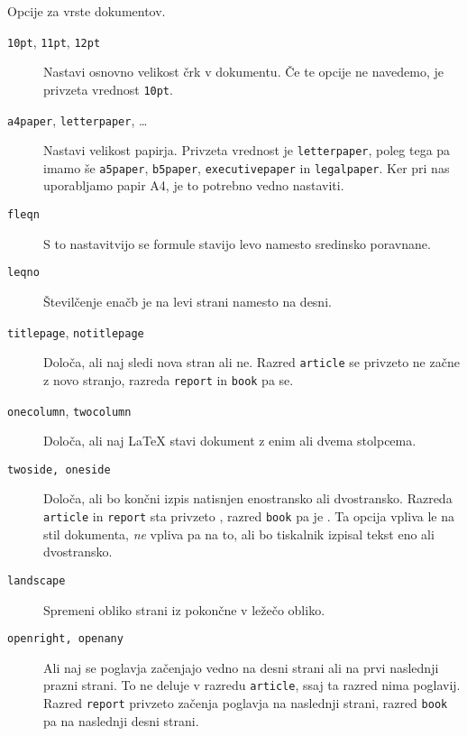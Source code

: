 \begin{table}[!bp]
\caption{Opcije za vrste dokumentov.} \label{options}
\begin{lined}{12cm}
\begin{flushleft}
\begin{description}
\item[\normalfont\texttt{10pt}, \texttt{11pt}, \texttt{12pt}] \quad Nastavi osnovno velikost črk v dokumentu.
  Če te opcije ne  navedemo, je privzeta vrednost \texttt{10pt}.  
\item[\normalfont\texttt{a4paper}, \texttt{letterpaper}, \ldots] \quad Nastavi 
  velikost papirja. Privzeta vrednost je \texttt{letterpaper}, poleg tega pa imamo 
  še \texttt{a5paper}, \texttt{b5paper}, \texttt{executivepaper}
  in \texttt{legalpaper}. Ker pri nas uporabljamo papir A4, je to potrebno 
  vedno nastaviti.
   

\item[\normalfont\texttt{fleqn}] \quad S to nastavitvijo se formule stavijo levo namesto 
sredinsko poravnane.

\item[\normalfont\texttt{leqno}] \quad Številčenje enačb je na levi strani namesto na desni.

\item[\normalfont\texttt{titlepage}, \texttt{notitlepage}] \quad Določa, ali naj 
 sledi nova stran ali ne. Razred 
\texttt{article} se privzeto ne začne z novo stranjo, razreda 
  \texttt{report} in \texttt{book} pa se.  

\item[\normalfont\texttt{onecolumn}, \texttt{twocolumn}] \quad Določa, ali naj \LaTeX{} stavi dokument 
z enim ali dvema stolpcema. 

\item[\normalfont\texttt{twoside, oneside}] \quad Določa, ali bo končni izpis natisnjen enostransko ali 
dvostransko. Razreda \texttt{article} in \texttt{report} sta privzeto , 
  razred \texttt{book} pa je . Ta opcija vpliva le na stil dokumenta, \emph{ne} 
  vpliva pa na to, ali bo tiskalnik izpisal tekst eno ali dvostransko.

\item[\normalfont\texttt{landscape}] \quad Spremeni obliko strani iz pokončne v ležečo obliko.
\item[\normalfont\texttt{openright, openany}] \quad Ali naj se poglavja začenjajo vedno na desni strani 
  ali na prvi naslednji prazni strani. To ne deluje v razredu \texttt{article}, ssaj ta razred nima
  poglavij. Razred \texttt{report} privzeto začenja poglavja na naslednji strani, razred \texttt{book} pa na 
  naslednji desni strani.


\end{description}
\end{flushleft}
\end{lined}
\end{table}
